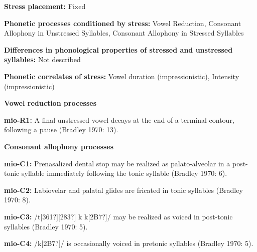 \begin{styleBody}
\textbf{Stress placement:} Fixed
\end{styleBody}

\begin{styleBody}
\textbf{Phonetic processes conditioned by stress:} Vowel Reduction, Consonant Allophony in Unstressed Syllables, Consonant Allophony in Stressed Syllables
\end{styleBody}

\begin{styleBody}
\textbf{Differences in phonological properties of stressed and unstressed syllables:} Not described
\end{styleBody}

\begin{styleBody}
\textbf{Phonetic correlates of stress: }Vowel duration (impressionistic), Intensity (impressionistic)
\end{styleBody}

\begin{styleBody}
\textbf{Vowel reduction processes}
\end{styleBody}

\begin{styleBody}
\textbf{mio-R1:} A final unstressed vowel decays at the end of a terminal contour, following a pause (Bradley 1970: 13).
\end{styleBody}

\begin{styleBody}
\textbf{Consonant allophony processes}
\end{styleBody}

\begin{styleBody}
\textbf{mio-C1: }Prenasalized dental stop may be realized as palato-alveolar in a post-tonic syllable immediately following the tonic syllable (Bradley 1970: 6).
\end{styleBody}

\begin{styleBody}
\textbf{mio-C2: }Labiovelar and palatal glides are fricated in tonic syllables (Bradley 1970: 8).
\end{styleBody}

\begin{styleBody}
\textbf{mio-C3: }/t[361?][283?] k k[2B7?]/ may be realized as voiced in post-tonic syllables (Bradley 1970: 5).
\end{styleBody}

\begin{styleBody}
\textbf{mio-C4: }/k[2B7?]/ is occasionally voiced in pretonic syllables (Bradley 1970: 5).
\end{styleBody}

